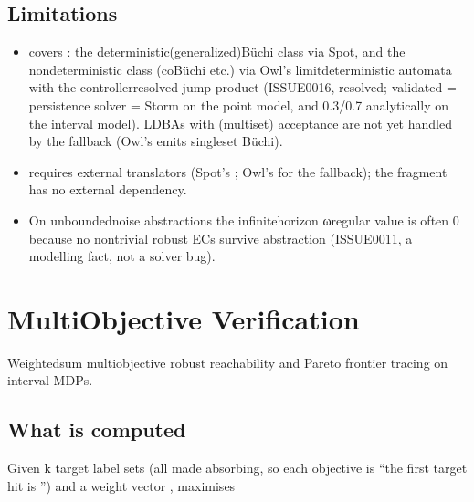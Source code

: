 \documentclass[a4paper,10pt,english]{sphinxmanual}
\begin{document}
\subsection{Limitations}
\label{\detokenize{manual/omega-ltl:limitations}}\begin{itemize}
\item {} 
\sphinxAtStartPar
{} covers : the deterministic\sphinxhyphen{}(generalized\sphinxhyphen{})Büchi class via Spot,
and the nondeterministic class (co\sphinxhyphen{}Büchi  etc.) via Owl’s limit\sphinxhyphen{}deterministic
automata with the controller\sphinxhyphen{}resolved jump product (ISSUE\sphinxhyphen{}0016, resolved; validated
 = persistence solver = Storm on the point model, and 0.3/0.7 analytically on
the interval model). LDBAs with  (multi\sphinxhyphen{}set) acceptance are not yet
handled by the fallback (Owl’s  emits single\sphinxhyphen{}set Büchi).

\item {} 
\sphinxAtStartPar
{} requires external translators (Spot’s ; Owl’s  for the
fallback); the  fragment has no external dependency.

\item {} 
\sphinxAtStartPar
On unbounded\sphinxhyphen{}noise abstractions the infinite\sphinxhyphen{}horizon ω\sphinxhyphen{}regular value is often 0
because no non\sphinxhyphen{}trivial robust ECs survive abstraction (ISSUE\sphinxhyphen{}0011, a modelling fact,
not a solver bug).

\end{itemize}

\sphinxstepscope


\section{Multi\sphinxhyphen{}Objective Verification}
\label{\detokenize{manual/multiobjective:multi-objective-verification}}\label{\detokenize{manual/multiobjective::doc}}
\sphinxAtStartPar
Weighted\sphinxhyphen{}sum multi\sphinxhyphen{}objective robust reachability and Pareto frontier tracing on
interval MDPs.


\subsection{What is computed}
\label{\detokenize{manual/multiobjective:what-is-computed}}
\sphinxAtStartPar
Given k target label sets  (all made absorbing, so each objective is
“the first target hit is ”) and a weight vector ,  maximises
\end{document}
